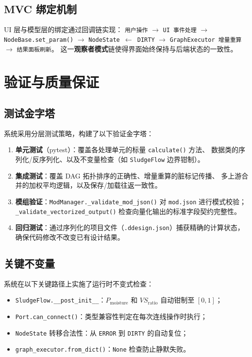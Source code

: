 \documentclass[12pt,a4paper]{ctexart}
\theoremstyle{definition}
\theoremstyle{remark}
\begin{document}
\subsection{MVC 绑定机制}

UI 层与模型层的绑定通过回调链实现：
\texttt{用户操作} $\to$ \texttt{UI 事件处理} $\to$ \texttt{NodeBase.set\_param()} $\to$
\texttt{NodeState $\gets$ DIRTY} $\to$ \texttt{GraphExecutor 增量重算} $\to$
\texttt{结果面板刷新}。
这一\textbf{观察者模式}链使得界面始终保持与后端状态的一致性。

\section{验证与质量保证}\label{sec:verification}

\subsection{测试金字塔}

系统采用分层测试策略，构建了以下验证金字塔：
\begin{enumerate}
  \item \textbf{单元测试}（pytest）：覆盖各处理单元的标量 \texttt{calculate()} 方法、
        数据类的序列化/反序列化、以及不变量检查（如 \texttt{SludgeFlow} 边界钳制）。
  \item \textbf{集成测试}：覆盖 DAG 拓扑排序的正确性、增量重算的脏标记传播、
        多上游合并的加权平均逻辑，以及保存/加载往返一致性。
  \item \textbf{模组验证}：\texttt{ModManager.\_validate\_mod\_json()} 对
        \texttt{mod.json} 进行模式校验；\texttt{\_validate\_vectorized\_output()}
        检查向量化输出的标准字段契约完整性。
  \item \textbf{回归测试}：通过序列化的项目文件（\texttt{.ddesign.json}）捕获精确的计算状态，
        确保代码修改不改变已有设计结果。
\end{enumerate}

\subsection{关键不变量}

系统在以下关键路径上实施了运行时不变式检查：
\begin{itemize}
  \item \texttt{SludgeFlow.\_\_post\_init\_\_}：$P_{\text{moisture}}$ 和 $VS_{\text{ratio}}$ 自动钳制至 $[0,1]$；
  \item \texttt{Port.can\_connect()}：类型兼容性判定在每次连线操作时执行；
  \item \texttt{NodeState} 转移合法性：从 \texttt{ERROR} 到 \texttt{DIRTY} 的自动复位；
  \item \texttt{graph\_executor.from\_dict()}：\texttt{None} 检查防止静默失败。
\end{itemize}
\end{document}
